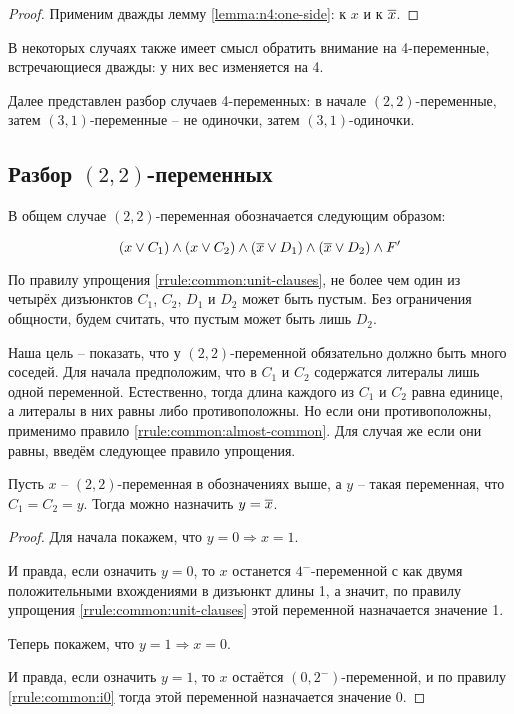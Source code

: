 \begin{proof}
 Применим дважды лемму \ref{lemma:n4:one-side}: к $x$ и к $\overline{x}$.
\end{proof}

В некоторых случаях также имеет смысл обратить внимание на 4-переменные, встречающиеся дважды: у них вес изменяется на 4.

Далее представлен разбор случаев 4-переменных: в начале $(2,2)$-переменные, затем $(3,1)$-переменные -- не одиночки, затем $(3,1)$-одиночки.

\subsection{Разбор $(2,2)$-переменных}
\label{subsec:n4:22}

\firstpar{}В общем случае $(2,2)$-переменная обозначается следующим образом:

$$
 (x \vee C_1) \wedge (x \vee C_2) \wedge (\overline{x} \vee D_1) \wedge (\overline{x} \vee D_2) \wedge F'
$$

По правилу упрощения \ref{rrule:common:unit-clauses}, не более чем один из четырёх дизъюнктов $C_1$, $C_2$, $D_1$ и $D_2$ может быть пустым. Без ограничения общности, будем считать, что пустым может быть лишь $D_2$.

Наша цель -- показать, что у $(2,2)$-переменной обязательно должно быть много соседей.
Для начала предположим, что в $C_1$ и $C_2$ содержатся литералы лишь одной переменной.
Естественно, тогда длина каждого из $C_1$  и $C_2$ равна единице, а литералы в них равны либо противоположны.
Но если они противоположны, применимо правило \ref{rrule:common:almost-common}.
Для случая же если они равны, введём следующее правило упрощения.

\begin{rrule}
 Пусть $x$ -- $(2,2)$-переменная в обозначениях выше, а $y$ -- такая переменная, что $C_1 = C_2 = y$. Тогда можно назначить $y = \overline{x}$.
\end{rrule}

\begin{proof}
 Для начала покажем, что $y = 0 \Rightarrow x = 1$.

 И правда, если означить $y = 0$, то $x$ останется $4^-$-переменной с как двумя положительными вхождениями в дизъюнкт длины 1, а значит, по правилу упрощения \ref{rrule:common:unit-clauses} этой переменной назначается значение 1.

 Теперь покажем, что $y = 1 \Rightarrow x = 0$.

 И правда, если означить $y = 1$, то $x$ остаётся $(0,2^-)$-переменной, и по правилу \ref{rrule:common:i0} тогда этой переменной назначается значение 0.
\end{proof}

